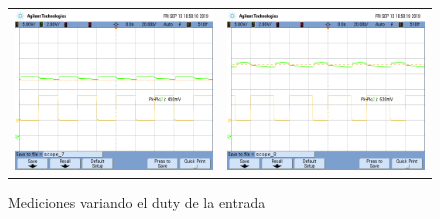 \begin{figure}[H]
\begin{tabular}{c c}
        \includegraphics[scale=0.2]{../Mediciones/Osciloscopio/Barrido_Duty/scope_7.png} & 
        \includegraphics[scale=0.2]{../Mediciones/Osciloscopio/Barrido_Duty/scope_8.png} \\
    \end{tabular}
    \caption{Mediciones variando el duty de la entrada}
    \label{fig:barrido_duty}
\end{figure}


